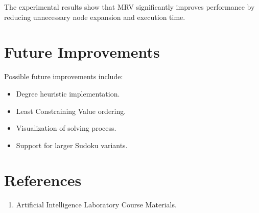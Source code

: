 \documentclass[12pt,a4paper]{article}
\begin{document}
The experimental results show that MRV significantly improves performance by
reducing unnecessary node expansion and execution time.




\section{Future Improvements}


Possible future improvements include:


\begin{itemize}

\item Degree heuristic implementation.

\item Least Constraining Value ordering.

\item Visualization of solving process.

\item Support for larger Sudoku variants.

\end{itemize}




\section*{References}


\begin{enumerate}



\item Artificial Intelligence Laboratory Course Materials.


\end{enumerate}
\end{document}
